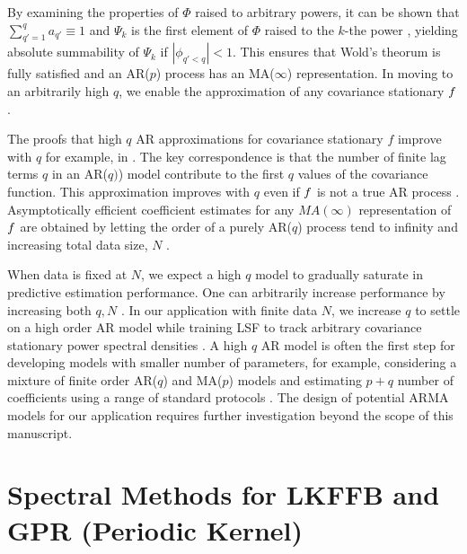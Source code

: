 By examining the properties of $\Phi$ raised to arbitrary powers, it can be shown that $\sum_{q'=1}^{q} a_{q'} \equiv 1$ and $\Psi_k$ is the first element of $\Phi$ raised to the $k$-the power \cite{hamilton1994time}, yielding absolute summability of $\Psi_k$ if $|\phi_{q'<q}| < 1$. This ensures that Wold's theorum is fully satisfied and an AR($p$) process has an MA($\infty$) representation. In moving to an arbitrarily high $q$, we enable the approximation of any covariance stationary $f$.

The proofs that high $q$ AR approximations for covariance stationary $f$ improve with $q$ for example, in \cite{wahlberg1989estimation}. The key correspondence is that the number of finite lag terms $q$ in an AR($q)$) model contribute to the first $q$ values of the covariance function. This approximation improves with $q$ even if $f$ is not a true AR process \cite{wahlberg1989estimation,west1996bayesian}. Asymptotically efficient coefficient estimates for any $MA(\infty)$ representation of $f$ are obtained by letting the order of a purely AR($q$) process tend to infinity and increasing total data size, $N$ \cite{wahlberg1989estimation}. 

When data is fixed at $N$, we expect a high $q$ model to gradually saturate in predictive estimation performance. One can arbitrarily increase performance by increasing both $q, N$ \cite{wahlberg1989estimation}.  In our application with finite data $N$, we increase $q$ to settle on a high order AR model while training LSF to track arbitrary covariance stationary power spectral densities \cite{brockwell1996introduction}. A high $q$ AR model is often the first step for developing models with smaller number of parameters, for example, considering a mixture of finite order AR($q$) and MA($p$) models and estimating $p+q$ number of coefficients using a range of standard protocols \cite{brockwell1996introduction,west1996bayesian}. The design of potential ARMA models for our application requires further investigation beyond the scope of this manuscript.




\newpage
\section{Spectral Methods for LKFFB and GPR (Periodic Kernel)} \label{sec:app:spec_methods}

